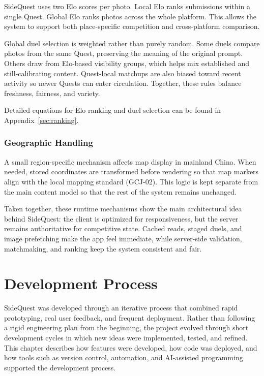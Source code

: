 \documentclass[12pt,a4paper,oneside]{report}
\begin{document}
SideQuest uses two Elo scores per photo. Local Elo ranks submissions within a single Quest. Global Elo ranks photos across the whole platform. This allows the system to support both place-specific competition and cross-platform comparison.

Global duel selection is weighted rather than purely random. Some duels compare photos from the same Quest, preserving the meaning of the original prompt. Others draw from Elo-based visibility groups, which helps mix established and still-calibrating content. Quest-local matchups are also biased toward recent activity so newer Quests can enter circulation. Together, these rules balance freshness, fairness, and variety.

Detailed equations for Elo ranking and duel selection can be found in Appendix~\ref{sec:ranking}.

\subsection*{Geographic Handling}

A small region-specific mechanism affects map display in mainland China. When needed, stored coordinates are transformed before rendering so that map markers align with the local mapping standard (GCJ-02). This logic is kept separate from the main content model so that the rest of the system remains unchanged.

Taken together, these runtime mechanisms show the main architectural idea behind SideQuest: the client is optimized for responsiveness, but the server remains authoritative for competitive state. Cached reads, staged duels, and image prefetching make the app feel immediate, while server-side validation, matchmaking, and ranking keep the system consistent and fair.


\chapter{Development Process}
\label{ch:development}

SideQuest was developed through an iterative process that combined rapid prototyping, real user feedback, and frequent deployment. Rather than following a rigid engineering plan from the beginning, the project evolved through short development cycles in which new ideas were implemented, tested, and refined. This chapter describes how features were developed, how code was deployed, and how tools such as version control, automation, and AI-assisted programming supported the development process.
\end{document}
